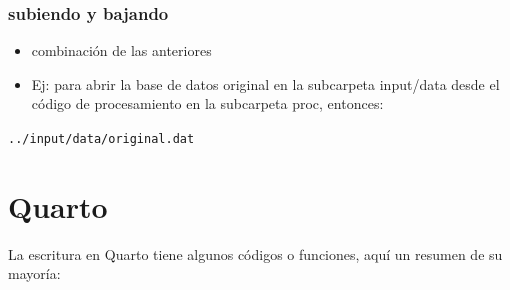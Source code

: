 \documentclass[
  letterpaper,
  DIV=11,
  numbers=noendperiod]{scrartcl}
\begin{document}
\subsubsection{subiendo y bajando}\label{subiendo-y-bajando}

\begin{itemize}
\item
  combinación de las anteriores
\item
  Ej: para abrir la base de datos original en la subcarpeta input/data
  desde el código de procesamiento en la subcarpeta proc, entonces:
\end{itemize}

\texttt{../input/data/original.dat}

\section{Quarto}\label{quarto}

La escritura en Quarto tiene algunos códigos o funciones, aquí un
resumen de su mayoría:
\end{document}
